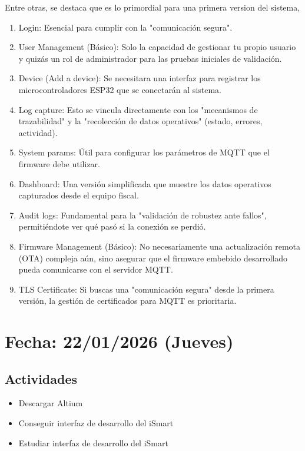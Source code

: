 \documentclass[12pt, a4paper]{article}
\begin{document}
    Entre otras, se destaca que es lo primordial para una primera version del sistema,

    \begin{enumerate}
        \item Login: Esencial para cumplir con la "comunicación segura".
        \item User Management (Básico): Solo la capacidad de gestionar tu propio usuario y quizás un rol de administrador para las pruebas iniciales de validación.
        \item Device (Add a device): Se necesitara una interfaz para registrar los microcontroladores ESP32 que se conectarán al sistema.
        \item Log capture: Esto se vincula directamente con los "mecanismos de trazabilidad" y la "recolección de datos operativos" (estado, errores, actividad).
        \item System params: Útil para configurar los parámetros de MQTT que el firmware debe utilizar.
        \item Dashboard: Una versión simplificada que muestre los datos operativos capturados desde el equipo fiscal.
        \item Audit logs: Fundamental para la "validación de robustez ante fallos", permitiéndote ver qué pasó si la conexión se perdió.
        \item Firmware Management (Básico): No necesariamente una actualización remota (OTA) compleja aún, sino asegurar que el firmware embebido desarrollado pueda comunicarse con el servidor MQTT.
        \item TLS Certificate: Si buscas una "comunicación segura" desde la primera versión, la gestión de certificados para MQTT es prioritaria.
    \end{enumerate}

    \section*{Fecha: 22/01/2026 (Jueves)} 

    \subsection*{Actividades}

    \begin{itemize}
        \item Descargar Altium
        \item Conseguir interfaz de desarrollo del iSmart
        \item Estudiar interfaz de desarrollo del iSmart
    \end{itemize}
\end{document}
